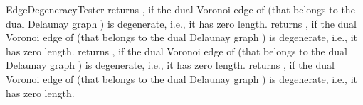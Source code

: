 \begin{ccRefFunctionObjectConcept}{EdgeDegeneracyTester}
\ccThreeToTwo
{}
{returns , if the dual Voronoi edge of  (that
  belongs to the dual Delaunay graph ) is
  degenerate, i.e., it has zero length.}
%
\ccGlue
{}
{returns , if the dual Voronoi edge of  (that
  belongs to the dual Delaunay graph ) is
  degenerate, i.e., it has zero length.}
%
\ccGlue
{}
{returns , if the dual Voronoi edge of  (that
  belongs to the dual Delaunay graph ) is
  degenerate, i.e., it has zero length.}
%
\ccGlue
{}
{returns , if the dual Voronoi edge of   (that
  belongs to the dual Delaunay graph ) is
  degenerate, i.e., it has zero length.}


\ccSeeAlso
{}

\end{ccRefFunctionObjectConcept}
